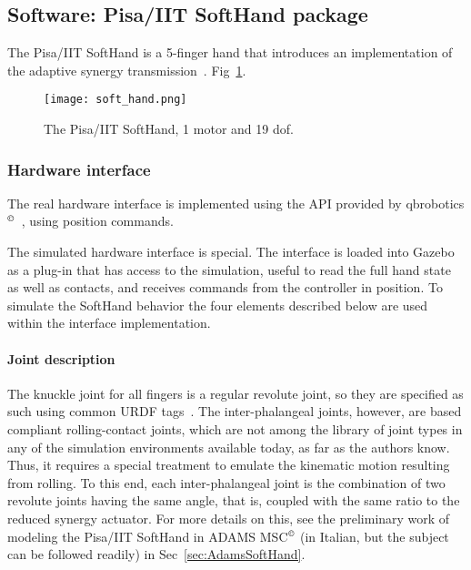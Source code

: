 \subsection{Software: Pisa/IIT SoftHand package}
\label{sec:softhand}

The Pisa/IIT SoftHand is a 5-finger hand that introduces an implementation of the adaptive synergy transmission~\cite{Catalano2014Adaptive}. Fig~\ref{fig:soft_hand}.

\begin{figure}[b]
\centering
\texttt{[image: soft\_hand.png]}
\caption{The Pisa/IIT SoftHand, 1 motor and 19 dof.}
\label{fig:soft_hand}
\end{figure}

\subsubsection{Hardware interface}

The real hardware interface is implemented using the API provided by qbrobotics$^{\copyright}$~\cite{qbrobotics_software}, using position commands. 

The simulated hardware interface is special. 
The interface is loaded into Gazebo as a plug-in that has access to the simulation, useful to read the full hand state as well as contacts, and receives commands from the controller in position. To simulate the SoftHand behavior the four elements described below are used within the interface implementation.

\paragraph{Joint description} The knuckle joint for all fingers is a regular revolute joint, so they are specified as such using common URDF tags~\cite{webros}. The inter-phalangeal joints, however, are based compliant rolling-contact joints, which are not among the library of joint types in any of the simulation environments available today, as far as the authors know. Thus, it requires a special treatment to emulate the kinematic motion resulting from rolling. To this end, each inter-phalangeal joint is the combination of two revolute joints having the same angle, that is, coupled with the same ratio to the reduced synergy actuator. For more details on this, see the preliminary work of modeling the Pisa/IIT SoftHand in ADAMS MSC$^\copyright$ (in Italian, but the subject can be followed readily) in Sec~\ref{sec:AdamsSoftHand}.

